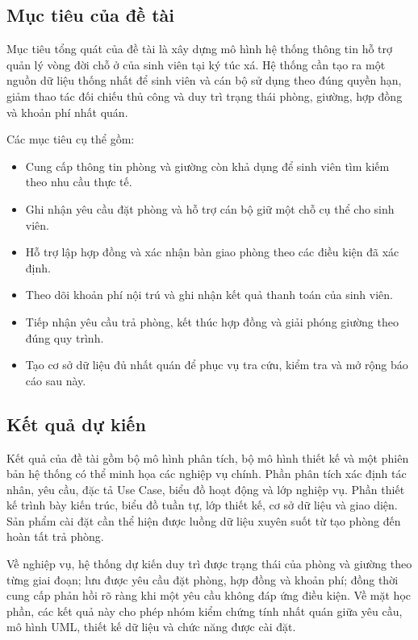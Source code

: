\subsection{Mục tiêu của đề tài}

Mục tiêu tổng quát của đề tài là xây dựng mô hình hệ thống thông tin hỗ trợ quản lý vòng đời chỗ ở của sinh viên tại ký túc xá. Hệ thống cần tạo ra một nguồn dữ liệu thống nhất để sinh viên và cán bộ sử dụng theo đúng quyền hạn, giảm thao tác đối chiếu thủ công và duy trì trạng thái phòng, giường, hợp đồng và khoản phí nhất quán.

Các mục tiêu cụ thể gồm:

\begin{itemize}[leftmargin=1.4em]
\item Cung cấp thông tin phòng và giường còn khả dụng để sinh viên tìm kiếm theo nhu cầu thực tế.
\item Ghi nhận yêu cầu đặt phòng và hỗ trợ cán bộ giữ một chỗ cụ thể cho sinh viên.
\item Hỗ trợ lập hợp đồng và xác nhận bàn giao phòng theo các điều kiện đã xác định.
\item Theo dõi khoản phí nội trú và ghi nhận kết quả thanh toán của sinh viên.
\item Tiếp nhận yêu cầu trả phòng, kết thúc hợp đồng và giải phóng giường theo đúng quy trình.
\item Tạo cơ sở dữ liệu đủ nhất quán để phục vụ tra cứu, kiểm tra và mở rộng báo cáo sau này.
\end{itemize}

\subsection{Kết quả dự kiến}

Kết quả của đề tài gồm bộ mô hình phân tích, bộ mô hình thiết kế và một phiên bản hệ thống có thể minh họa các nghiệp vụ chính. Phần phân tích xác định tác nhân, yêu cầu, đặc tả Use Case, biểu đồ hoạt động và lớp nghiệp vụ. Phần thiết kế trình bày kiến trúc, biểu đồ tuần tự, lớp thiết kế, cơ sở dữ liệu và giao diện. Sản phẩm cài đặt cần thể hiện được luồng dữ liệu xuyên suốt từ tạo phòng đến hoàn tất trả phòng.

Về nghiệp vụ, hệ thống dự kiến duy trì được trạng thái của phòng và giường theo từng giai đoạn; lưu được yêu cầu đặt phòng, hợp đồng và khoản phí; đồng thời cung cấp phản hồi rõ ràng khi một yêu cầu không đáp ứng điều kiện. Về mặt học phần, các kết quả này cho phép nhóm kiểm chứng tính nhất quán giữa yêu cầu, mô hình UML, thiết kế dữ liệu và chức năng được cài đặt.

